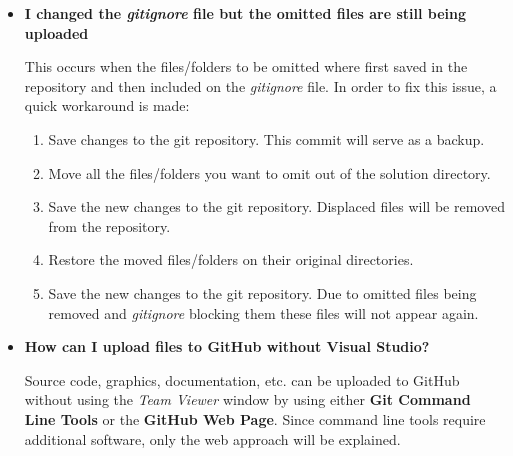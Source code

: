 \begin{itemize}
	\item \textbf{I changed the \textit{gitignore} file but the omitted files are still being uploaded}
	
	This occurs when the files/folders to be omitted where first saved in the repository and then included on the \textit{gitignore} file. In order to fix this issue, a quick workaround is made:
	
	\begin{enumerate}
		\item Save changes to the git repository. This commit will serve as a backup.
		\item Move all the files/folders you want to omit out of the solution directory.
		\item Save the new changes to the git repository. Displaced files will be removed from the repository.
		\item Restore the moved files/folders on their original directories.
		\item Save the new changes to the git repository. Due to omitted files being removed and \textit{gitignore} blocking them these files will not appear again.
	\end{enumerate}


	\item \textbf{How can I upload files to GitHub without Visual Studio?}
		
	Source code, graphics, documentation, etc. can be uploaded to GitHub without using the \textit{Team Viewer} window by using either \textbf{Git Command Line Tools} or the \textbf{GitHub Web Page}. Since command line tools require additional software, only the web approach will be explained. 
		
%		
		

\end{itemize}
